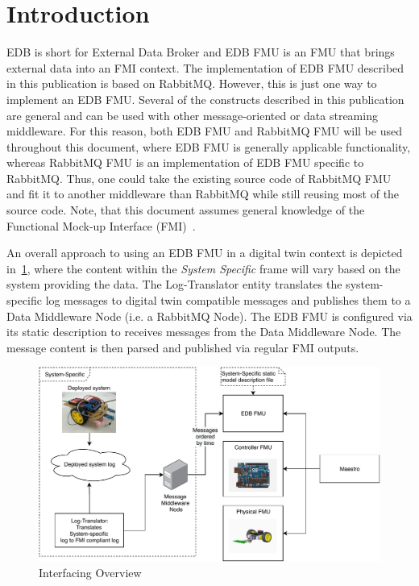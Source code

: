 \section{Introduction}\label{sec:intro}
EDB is short for External Data Broker and EDB FMU is an FMU that brings external
data into an FMI context. The implementation of EDB FMU described in this
publication is based on RabbitMQ. However, this is just one way to implement an
EDB FMU. Several of the constructs described in this publication are general and
can be used with other message-oriented or data streaming middleware. For this
reason, both EDB FMU and RabbitMQ FMU will be used throughout this document,
where EDB FMU is generally applicable functionality, whereas RabbitMQ FMU is an
implementation of EDB FMU specific to RabbitMQ. Thus, one could take the
existing source code of RabbitMQ FMU and fit it to another middleware than
RabbitMQ while still reusing most of the source code.
Note, that this document assumes general knowledge of
the Functional Mock-up Interface (FMI)~\cite{FMIStandard2.1}.

An overall approach to using an EDB FMU in a digital twin context is depicted
in~\cref{fig:interfacing_overview}, where the content within the \textit{System Specific} frame will vary based on the system
providing the data. The Log-Translator entity translates the
system-specific log messages to digital twin compatible messages and publishes
them to a Data Middleware Node (i.e. a RabbitMQ Node). The EDB FMU is configured
via its static description to
receives messages from the Data Middleware Node. The message content is then
parsed and published via regular FMI outputs.

\begin{figure}[htb]
  \includegraphics[width=\textwidth]{figures/overview.pdf}
  \caption{Interfacing Overview}
 \label{fig:interfacing_overview}
\end{figure}

